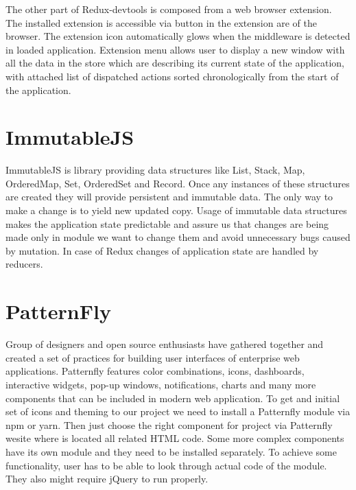 The other part of Redux-devtools is composed from a web browser extension. The installed extension is accessible via button in the extension are of the browser. The extension icon automatically glows when the middleware is detected in loaded application. Extension menu allows user to display a new window with all the data in the store which are describing its current state of the application, with attached list of dispatched actions sorted chronologically from the start of the application.

\section{ImmutableJS}
ImmutableJS\cite{immutable} is library providing data structures like List, Stack, Map, OrderedMap, Set, OrderedSet and Record. Once any instances of these structures are created they will provide persistent and immutable data. The only way to make a change is to yield new updated copy. Usage of immutable data structures makes the application state predictable and assure us that changes are being made only in module we want to change them and avoid unnecessary bugs caused by mutation. In case of Redux changes of application state are handled by reducers.

\section{PatternFly}
Group of designers and open source enthusiasts have gathered together and created a set of practices for building user interfaces of enterprise web applications. Patternfly features color combinations, icons, dashboards, interactive widgets, pop-up windows, notifications, charts and many more components that can be included in modern web application. To get and initial set of icons and theming to our project we need to install a Patternfly module via npm\cite{npm} or yarn\cite{yarn}. Then just choose the right component for project via Patternfly wesite\cite{Patternfly} where is located all related HTML code. Some more complex components have its own module and they need to be installed separately. To achieve some functionality, user has to be able to look through actual code of the module. They also might require jQuery to run properly.

